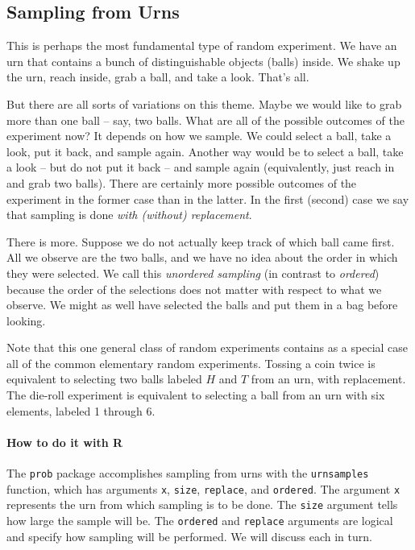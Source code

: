 \documentclass[captions=tableheading]{scrbook}
\begin{document}
\subsection{Sampling from Urns}
\label{sec-3-1-1}

\label{sub:sampling-from-urns}

This is perhaps the most fundamental type of random experiment. We have an urn that contains a bunch of distinguishable objects (balls) inside. We shake up the urn, reach inside, grab a ball, and take a look. That's all.

But there are all sorts of variations on this theme. Maybe we would like to grab more than one ball -- say, two balls. What are all of the possible outcomes of the experiment now? It depends on how we sample. We could select a ball, take a look, put it back, and sample again. Another way would be to select a ball, take a look -- but do not put it back -- and sample again (equivalently, just reach in and grab two balls). There are certainly more possible outcomes of the experiment in the former case than in the latter. In the first (second) case we say that sampling is done \emph{with (without) replacement}.

There is more. Suppose we do not actually keep track of which ball came first. All we observe are the two balls, and we have no idea about the order in which they were selected. We call this \emph{unordered sampling} (in contrast to \emph{ordered}) because the order of the selections does not matter with respect to what we observe. We might as well have selected the balls and put them in a bag before looking.

Note that this one general class of random experiments contains as a special case all of the common elementary random experiments. Tossing a coin twice is equivalent to selecting two balls labeled \(H\) and \(T\) from an urn, with replacement. The die-roll experiment is equivalent to selecting a ball from an urn with six elements, labeled 1 through 6.

\paragraph*{How to do it with \textsf{R}} 

The \texttt{prob} package accomplishes sampling from urns with the \texttt{urnsamples} function, which has arguments \texttt{x}, \texttt{size}, \texttt{replace}, and \texttt{ordered}. The argument \texttt{x} represents the urn from which sampling is to be done. The \texttt{size} argument tells how large the sample will be. The \texttt{ordered} and \texttt{replace} arguments are logical and specify how sampling will be performed. We will discuss each in turn.
\end{document}
